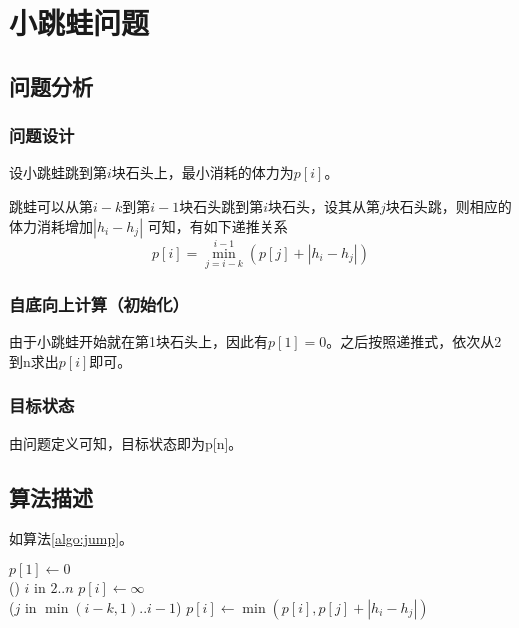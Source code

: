 \section{小跳蛙问题}

\subsection{问题分析}

\subsubsection{问题设计}

设小跳蛙跳到第$i$块石头上，最小消耗的体力为$p[i]$。

跳蛙可以从第$i-k$到第$i-1$块石头跳到第$i$块石头，设其从第$j$块石头跳，则相应的体力消耗增加$|h_i - h_j|$
可知，有如下递推关系 
\begin{equation}
    \displaystyle
    p[i] = \min_{j = i-k}^{i-1}(p[j] + |h_i - h_j|)
\end{equation}

\subsubsection{自底向上计算（初始化）}

由于小跳蛙开始就在第1块石头上，因此有$p[1] = 0$。之后按照递推式，依次从2到n求出$p[i]$即可。

\subsubsection{目标状态}

由问题定义可知，目标状态即为p[n]。

\subsection{算法描述}
如算法\ref{algo:jump}。

\begin{algorithm}[H]
    \caption{$jump(h[1..n],k)$}\label{algo:jump}
    $p[1] \leftarrow 0$\\
    \For(){ $i$ in $2..n$ }{
       $ p[i] \leftarrow \infty$\\
       \For($j$ in $\min(i-k,1)..i-1$){
            $p[i] \leftarrow \min(p[i],p[j] + |h_i-h_j|)$\\
       } 
    }
\end{algorithm}


